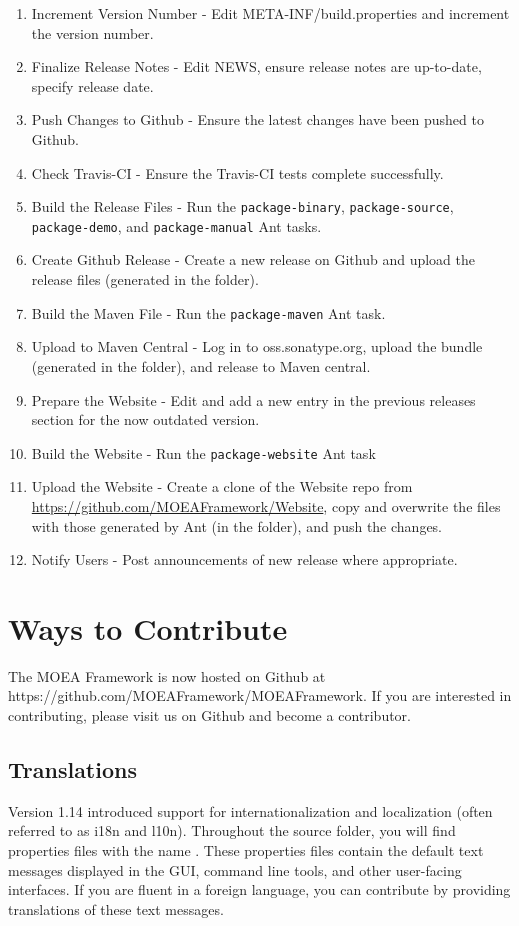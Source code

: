 \begin{enumerate}
  \item Increment Version Number - Edit META-INF/build.properties and increment the version number.
	\item Finalize Release Notes - Edit NEWS, ensure release notes are up-to-date, specify release date.
	\item Push Changes to Github - Ensure the latest changes have been pushed to Github.
	\item Check Travis-CI - Ensure the Travis-CI tests complete successfully.
	\item Build the Release Files - Run the \texttt{package-binary}, \texttt{package-source}, \texttt{package-demo}, and \texttt{package-manual} Ant tasks.
	\item Create Github Release - Create a new release on Github and upload the release files (generated in the  folder).
	\item Build the Maven File - Run the \texttt{package-maven} Ant task.
	\item Upload to Maven Central - Log in to oss.sonatype.org, upload the bundle (generated in the  folder), and release to Maven central.
	\item Prepare the Website - Edit  and add a new entry in the previous releases section for the now outdated version.
	\item Build the Website - Run the \texttt{package-website} Ant task
	\item Upload the Website - Create a clone of the Website repo from \url{https://github.com/MOEAFramework/Website}, copy and overwrite the files with those generated by Ant (in the  folder), and push the changes.
	\item Notify Users - Post announcements of new release where appropriate.
\end{enumerate}

\section{Ways to Contribute}
The MOEA Framework is now hosted on Github at https://github.com/MOEAFramework/MOEAFramework.  If you are interested in contributing, please visit us on Github and become a contributor.

\subsection{Translations}
Version 1.14 introduced support for internationalization and localization (often referred to as i18n and l10n).  Throughout the source folder, you will find properties files with the name .  These properties files contain the default text messages displayed in the GUI, command line tools, and other user-facing interfaces.  If you are fluent in a foreign language, you can contribute by providing translations of these text messages.

